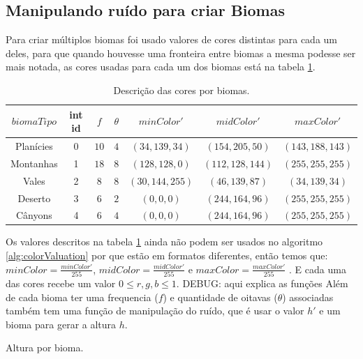\subsection{Manipulando ruído para criar Biomas}
Para criar múltiplos biomas foi usado valores de cores distintas para cada um deles, 
para que quando houvesse uma fronteira entre biomas a mesma podesse ser mais notada, as
cores usadas para cada um dos biomas está na tabela \ref{tab:bioColors}.
\begin{table}[H]
    \centering
    \caption{Descrição das cores por biomas.}
    \label{tab:bioColors}
    \begin{tabular}{| c | c c c c c c|}
        \hline
        $biomaTipo$ & int id & $f$ & $\theta$ & $minColor'$ & $midColor'$ & $maxColor'$\\
        \hline
        Planícies   & 0 & $10$ & $4$ & $(34, 139, 34) $ & $(154, 205, 50) $ & $(143,188,143)  $  \\
        Montanhas & 1 & $18$ & $8$ & $(128, 128, 0) $ & $(112, 128, 144)$ & $(255, 255, 255)$  \\
        Vales   & 2 & $8$  & $8$ & $(30, 144, 255)$ & $(46, 139, 87)  $ & $(34, 139, 34)  $  \\
        Deserto   & 3 & $6$  & $2$ & $(0, 0, 0)     $ & $(244, 164, 96) $ & $(255, 255, 255)$  \\
        Cânyons  & 4 & $6$  & $4$ & $(0, 0, 0)     $ & $(244, 164, 96) $ & $(255, 255, 255)$  \\
        \hline
    \end{tabular}
\end{table}

Os valores descritos na tabela \ref{tab:bioColors} ainda não podem ser usados no
algoritmo \ref{alg:colorValuation} por que estão em formatos diferentes, então temos
que: $minColor = \frac{minColor'}{255}$, $midColor = \frac{midColor'}{255}$ e $maxColor = \frac{maxColor'}{255}$ . E cada uma das cores recebe um valor
$0 \leq r, g, b \leq 1$.
DEBUG: aqui explica as funções
Além de cada bioma ter uma frequencia ($f$) e quantidade de oitavas ($\theta$) associadas
também tem uma função de manipulação do ruído, que é usar o valor $h'$ e um bioma
para gerar a altura $h$.

\begin{algorithm}[H]\label{alg:hBioValuation}
    
    \caption{Altura por bioma.}
\end{algorithm}

